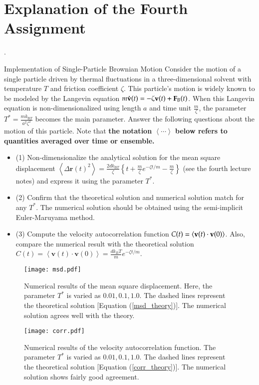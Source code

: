 \documentclass[aspectratio=169,dvipdfmx,cjk,handout,hyperref,8pt]{beamer} %
\newcommand{\tk}[1]{{\bf \color{blue} #1}}
\theoremstyle{example}
\newcommand{\bi}{\begin{itemize}}
\newcommand{\ei}{\end{itemize}}
\newcommand{\ave}[1]{\left\langle {#1} \right\rangle}
\begin{document}
\section{Explanation of the Fourth Assignment}
\begin{frame}{\thesection.~\insertsection}  
\begin{exampleblock}{ Implementation of Single-Particle Brownian Motion}
Consider the motion of a single particle driven by thermal fluctuations in a three-dimensional solvent with temperature $T$ and friction coefficient $\zeta$. This particle's motion is widely known to be modeled by the Langevin equation $m{\bf \dot{v}}(t) = -\zeta {\bf v}(t) + {\bf F}_{\rm B}(t)$. When this Langevin equation is non-dimensionalized using length $a$ and time unit $\frac{m}{\zeta}$, the parameter $T^*=\frac{mk_{\mathrm{B}T}}{a^2\zeta^2}$ becomes the main parameter. Answer the following questions about the motion of this particle. Note that \tk{the notation $\ave{\cdots}$ below refers to quantities averaged over time or ensemble.}
\bi
\item[(1)] Non-dimensionalize the analytical solution for the mean square displacement $\ave{\Delta \mathbf{r}(t)^2}=\frac{2dk_{\mathrm{B}T}}{\zeta}\left\{t+\frac{m}{\zeta}e^{-\zeta t/m}-\frac{m}{\zeta}\right\}$ (see the fourth lecture notes) and express it using the parameter $T^*$.
\item[(2)] Confirm that the theoretical solution and numerical solution match for any $T^*$. The numerical solution should be obtained using the semi-implicit Euler-Maruyama method.
\item[(3)] Compute the velocity autocorrelation function
$C(t)=\langle{\bf v}(t)\cdot{\bf v}(0)\rangle$. Also, compare the numerical result with the theoretical solution $C(t)=\ave{\mathbf{v}(t)\cdot\mathbf{v}(0)}=\frac{dk_BT}{m}e^{-\zeta t/m}$.
\ei
\end{exampleblock}

\begin{figure}
\texttt{[image: msd.pdf]}
\caption{Numerical results of the mean square displacement. Here, the parameter $T^*$ is varied as $0.01,0.1,1.0$. The dashed lines represent the theoretical solution [Equation (\ref{msd_theory})]. The numerical solution agrees well with the theory.}
\label{fig:fig1}
\end{figure}
\begin{figure}
\texttt{[image: corr.pdf]}
\caption{Numerical results of the velocity autocorrelation function. The parameter $T^*$ is varied as $0.01,0.1,1.0$. The dashed lines represent the theoretical solution [Equation (\ref{corr_theory})]. The numerical solution shows fairly good agreement.}
\label{fig:fig2}
\end{figure}



\end{frame}
\end{document}
